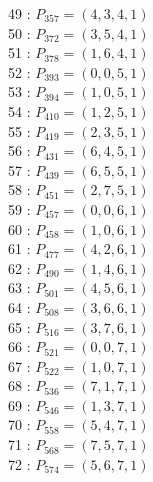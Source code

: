 \documentclass{article}
\begin{document}
{\begin{multicols}{3}
49 : $P_{357}=( 4, 3, 4, 1 )$\\
50 : $P_{372}=( 3, 5, 4, 1 )$\\
51 : $P_{378}=( 1, 6, 4, 1 )$\\
52 : $P_{393}=( 0, 0, 5, 1 )$\\
53 : $P_{394}=( 1, 0, 5, 1 )$\\
54 : $P_{410}=( 1, 2, 5, 1 )$\\
55 : $P_{419}=( 2, 3, 5, 1 )$\\
56 : $P_{431}=( 6, 4, 5, 1 )$\\
57 : $P_{439}=( 6, 5, 5, 1 )$\\
58 : $P_{451}=( 2, 7, 5, 1 )$\\
59 : $P_{457}=( 0, 0, 6, 1 )$\\
60 : $P_{458}=( 1, 0, 6, 1 )$\\
61 : $P_{477}=( 4, 2, 6, 1 )$\\
62 : $P_{490}=( 1, 4, 6, 1 )$\\
63 : $P_{501}=( 4, 5, 6, 1 )$\\
64 : $P_{508}=( 3, 6, 6, 1 )$\\
65 : $P_{516}=( 3, 7, 6, 1 )$\\
66 : $P_{521}=( 0, 0, 7, 1 )$\\
67 : $P_{522}=( 1, 0, 7, 1 )$\\
68 : $P_{536}=( 7, 1, 7, 1 )$\\
69 : $P_{546}=( 1, 3, 7, 1 )$\\
70 : $P_{558}=( 5, 4, 7, 1 )$\\
71 : $P_{568}=( 7, 5, 7, 1 )$\\
72 : $P_{574}=( 5, 6, 7, 1 )$\\
\end{multicols}


%


%


}%
\end{document}
